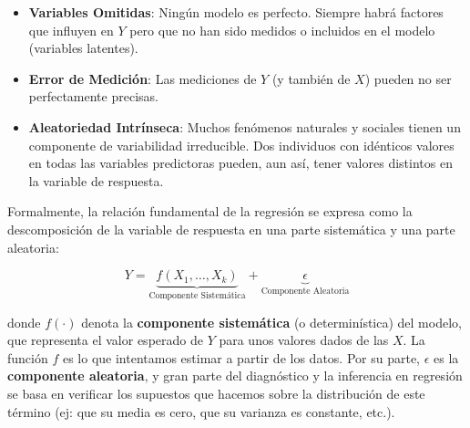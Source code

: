 \documentclass[
  letterpaper,
  DIV=11,
  numbers=noendperiod]{scrreprt}
\providecommand{\tightlist}{%
  \setlength{\itemsep}{0pt}\setlength{\parskip}{0pt}}
\begin{document}
\begin{itemize}
\tightlist
\item
  \textbf{Variables Omitidas}: Ningún modelo es perfecto. Siempre habrá
  factores que influyen en \(Y\) pero que no han sido medidos o
  incluidos en el modelo (variables latentes).
\item
  \textbf{Error de Medición}: Las mediciones de \(Y\) (y también de
  \(X\)) pueden no ser perfectamente precisas.
\item
  \textbf{Aleatoriedad Intrínseca}: Muchos fenómenos naturales y
  sociales tienen un componente de variabilidad irreducible. Dos
  individuos con idénticos valores en todas las variables predictoras
  pueden, aun así, tener valores distintos en la variable de respuesta.
\end{itemize}

Formalmente, la relación fundamental de la regresión se expresa como la
descomposición de la variable de respuesta en una parte sistemática y
una parte aleatoria:

\[Y = \underbrace{f(X_1, \ldots, X_k)}_{\text{Componente Sistemática}} + \underbrace{\epsilon}_{\text{Componente Aleatoria}}\]

donde \(f(\cdot)\) denota la \textbf{componente sistemática} (o
determinística) del modelo, que representa el valor esperado de \(Y\)
para unos valores dados de las \(X\). La función \(f\) es lo que
intentamos estimar a partir de los datos. Por su parte, \(\epsilon\) es
la \textbf{componente aleatoria}, y gran parte del diagnóstico y la
inferencia en regresión se basa en verificar los supuestos que hacemos
sobre la distribución de este término (ej: que su media es cero, que su
varianza es constante, etc.).
\end{document}
